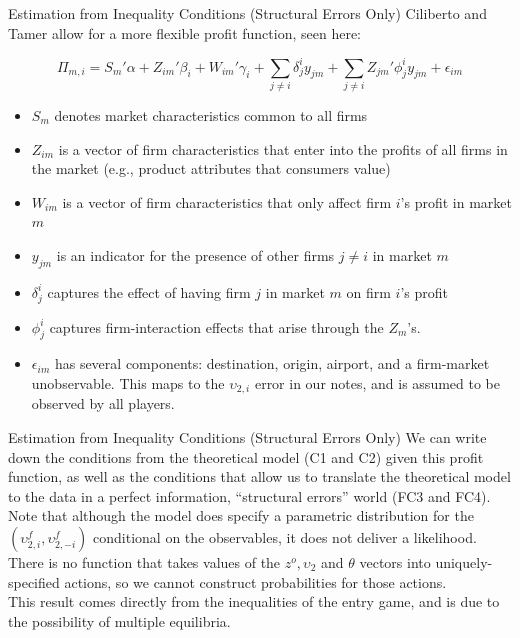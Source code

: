 \documentclass[xcolor=pdftex,dvipsnames,table,mathserif]{beamer}
\begin{document}
\begin{frame}{\normalsize Estimation from Inequality Conditions (Structural Errors Only)}
Ciliberto and Tamer allow for a more flexible profit function, seen here:

\begin{equation*}
\Pi_{m,i} =S_m'\alpha + Z_{im}' \beta_i + W_{im}'\gamma_i + \sum_{j \neq i} \delta_{j}^{i}y_{jm} + \sum_{j \neq i} Z_{jm}'\phi_j^i y_{jm} + \epsilon_{im}
\end{equation*}

\noindent
\footnotesize
\begin{itemize}
\item $S_m$ denotes market characteristics common to all firms
\item $Z_{im}$ is a vector of firm characteristics that enter into the profits of all firms in the market (e.g., product attributes that consumers value)
\item $W_{im}$ is a vector of firm characteristics that only affect firm $i$'s profit in market $m$
\item $y_{jm}$ is an indicator for the presence of other firms $j\neq i$ in market $m$
\item $\delta_{j}^{i}$ captures the effect of having firm $j$ in market $m$ on firm $i$'s profit
\item $\phi_j^i$ captures firm-interaction effects that arise through the $Z_m$'s.
\item $\epsilon_{im}$ has several components: destination, origin, airport, and a firm-market unobservable.  This maps to the $\upsilon_{2,i}$ error in our notes, and is assumed to be observed by all players.
\end{itemize}
\end{frame}

\begin{frame}{\normalsize Estimation from Inequality Conditions (Structural Errors Only)}
We can write down the conditions from the theoretical model (C1 and C2) given this profit function, as well as the conditions that allow us to translate the theoretical model to the data in a perfect information, ``structural errors'' world (FC3 and FC4).  \\
\vspace{0.2in} 
Note that although the model
does specify a parametric distribution for the $(\upsilon
_{2,i}^{f},\upsilon _{2,-i}^{f})$ conditional on the observables, it does
not deliver a likelihood.  \\
\vspace{0.2in} There is no function that takes values of the $%
z^{o},\upsilon _{2}$ and $\theta $ vectors into uniquely-specified actions,
so we cannot construct probabilities for those actions.  \\
\vspace{0.2in} 
This result comes directly from the inequalities of the entry game, and is due to the possibility of multiple equilibria.  
\end{frame}
\end{document}
